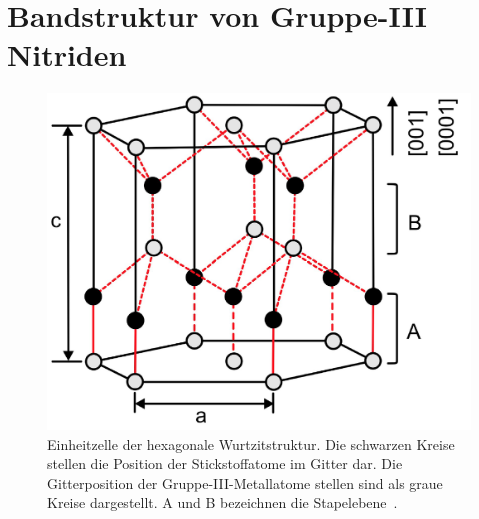 

\thispagestyle{fancy}

\section{Bandstruktur von Gruppe-III Nitriden}
\begin{figure}[htb]
    \centering
    \begin{minipage}[t]{\linewidth}
        \centering
        \includegraphics[width=0.5\linewidth]{Bilder/frenWurtzite.png}
        \caption{Einheitzelle der hexagonale Wurtzitstruktur. Die schwarzen Kreise stellen die Position der Stickstoffatome im Gitter dar. Die Gitterposition der Gruppe-III-Metallatome stellen sind als graue Kreise dargestellt. A und B bezeichnen die Stapelebene~\cite{mtrup}.  }
        \label{fig:wurtz}
    \end{minipage}%
\end{figure}
\vspace{1cm}
\raggedright


